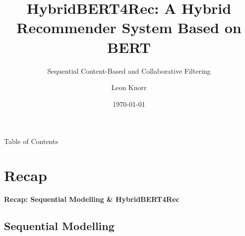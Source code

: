 \documentclass[en]{sdqbeamer}
\title[HybridBERT4Rec]{HybridBERT4Rec: A Hybrid Recommender System Based on BERT}
\subtitle{Sequential Content-Based and Collaborative Filtering}
\author[Leon Knorr]{Leon Knorr}
\date[\today]{\today}
\begin{document}
 
\KITtitleframe

\begin{frame}{Table of Contents}
\tableofcontents
\end{frame}

\section{Recap}

\begin{frame}
	\centering\textbf{\LARGE{Recap: Sequential Modelling \& HybridBERT4Rec}}
\end{frame}

\subsection{Sequential Modelling}
\end{document}
